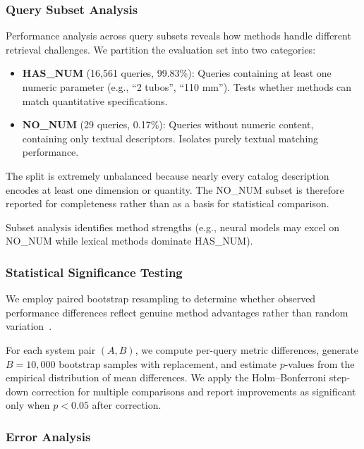 \documentclass[preprint,review,12pt]{elsarticle}
\begin{document}
\subsubsection{Query Subset Analysis}

Performance analysis across query subsets reveals how methods handle different retrieval challenges. We partition the evaluation set into two categories:

\begin{itemize}
    \item \textbf{HAS\_NUM} (16,561 queries, 99.83\%): Queries containing at least one numeric parameter (e.g., ``2 tubos'', ``110 mm''). Tests whether methods can match quantitative specifications.

    \item \textbf{NO\_NUM} (29 queries, 0.17\%): Queries without numeric content, containing only textual descriptors. Isolates purely textual matching performance.

\end{itemize}

The split is extremely unbalanced because nearly every catalog description encodes at least one dimension or quantity. The NO\_NUM subset is therefore reported for completeness rather than as a basis for statistical comparison.

Subset analysis identifies method strengths (e.g., neural models may excel on NO\_NUM while lexical methods dominate HAS\_NUM).

\subsubsection{Statistical Significance Testing}
\label{subsec:significance}

We employ paired bootstrap resampling to determine whether observed performance differences reflect genuine method advantages rather than random variation~\citep{smucker2007comparison}.

For each system pair $(A, B)$, we compute per-query metric differences, generate $B=10{,}000$ bootstrap samples with replacement, and estimate $p$-values from the empirical distribution of mean differences. We apply the Holm--Bonferroni step-down correction for multiple comparisons and report improvements as significant only when $p < 0.05$ after correction.

\subsubsection{Error Analysis}
\label{subsec:error_taxonomy}
\end{document}
